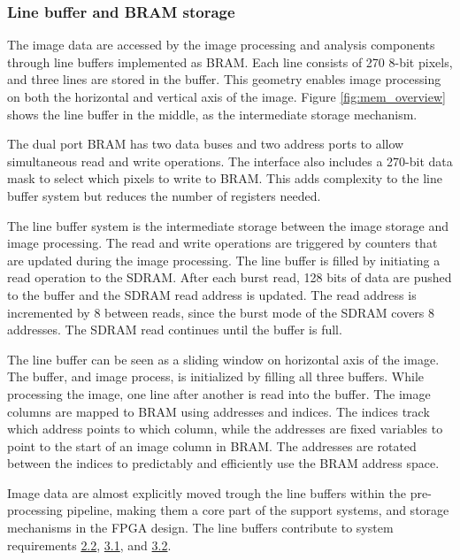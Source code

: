 \documentclass[12pt]{report}
\begin{document}
\subsubsection{Line buffer and BRAM storage}
The image data are accessed by the image processing and analysis components through line buffers implemented as BRAM. Each line consists of 270 8-bit pixels, and three lines are stored in the buffer. This geometry enables image processing on both the horizontal and vertical axis of the image. Figure \ref*{fig:mem_overview} shows the line buffer in the middle, as the intermediate storage mechanism.
\par
The dual port BRAM has two data buses and two address ports to allow simultaneous read and write operations. The interface also includes a 270-bit data mask to select which pixels to write to BRAM. This adds complexity to the line buffer system but reduces the number of registers needed.
\par
The line buffer system is the intermediate storage between the image storage and image processing. The read and write operations are triggered by counters that are updated during the image processing. The line buffer is filled by initiating a read operation to the SDRAM. After each burst read, 128 bits of data are pushed to the buffer and the SDRAM read address is updated. The read address is incremented by 8 between reads, since the burst mode of the SDRAM covers 8 addresses. The SDRAM read continues until the buffer is full.
\par
The line buffer can be seen as a sliding window on horizontal axis of the image. The buffer, and image process, is initialized by filling all three buffers. While processing the image, one line after another is read into the buffer. The image columns are mapped to BRAM using addresses and indices. The indices track which address points to which column, while the addresses are fixed variables to point to the start of an image column in BRAM. The addresses are rotated between the indices to predictably and efficiently use the BRAM address space.
\par
Image data are almost explicitly moved trough the line buffers within the pre-processing pipeline, making them a core part of the support systems, and storage mechanisms in the FPGA design. The line buffers contribute to system requirements \hyperref[req2.2]{2.2}, \hyperref[req3.1]{3.1}, and \hyperref[req3.2]{3.2}.
\end{document}
